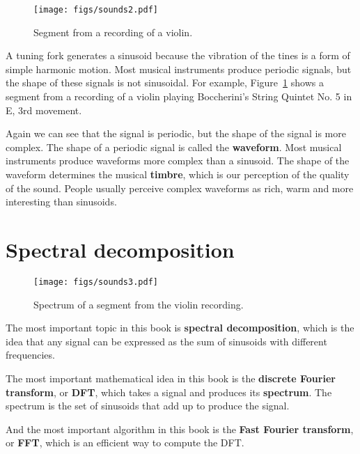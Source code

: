 \documentclass[12pt]{book} \usepackage[width=5.5in,height=8.5in, hmarginratio=3:2,vmarginratio=1:1]{geometry}
\begin{document}
\begin{figure} 

\centerline{\texttt{[image: figs/sounds2.pdf]}} \caption{Segment from a recording of a violin.} \label{fig.sounds2} \end{figure} 

A tuning fork generates a sinusoid because the vibration of the tines is a form of simple harmonic motion. Most musical instruments produce periodic signals, but the shape of these signals is not sinusoidal. For example, Figure~\ref{fig.sounds2} shows a segment from a recording of a violin playing Boccherini's String Quintet No. 5 in E, 3rd movement. 

Again we can see that the signal is periodic, but the shape of the signal is more complex. The shape of a periodic signal is called the {\bf waveform}. Most musical instruments produce waveforms more complex than a sinusoid. The shape of the waveform determines the musical {\bf timbre}, which is our perception of the quality of the sound. People usually perceive complex waveforms as rich, warm and more interesting than sinusoids. 

\section{Spectral decomposition} 

\begin{figure} 

\centerline{\texttt{[image: figs/sounds3.pdf]}} \caption{Spectrum of a segment from the violin recording.} \label{fig.sounds3} \end{figure} 

The most important topic in this book is {\bf spectral decomposition}, which is the idea that any signal can be expressed as the sum of sinusoids with different frequencies. 

The most important mathematical idea in this book is the {\bf discrete Fourier transform}, or {\bf DFT}, which takes a signal and produces its {\bf spectrum}. The spectrum is the set of sinusoids that add up to produce the signal. 

And the most important algorithm in this book is the {\bf Fast Fourier transform}, or {\bf FFT}, which is an efficient way to compute the DFT. 
\end{document}
